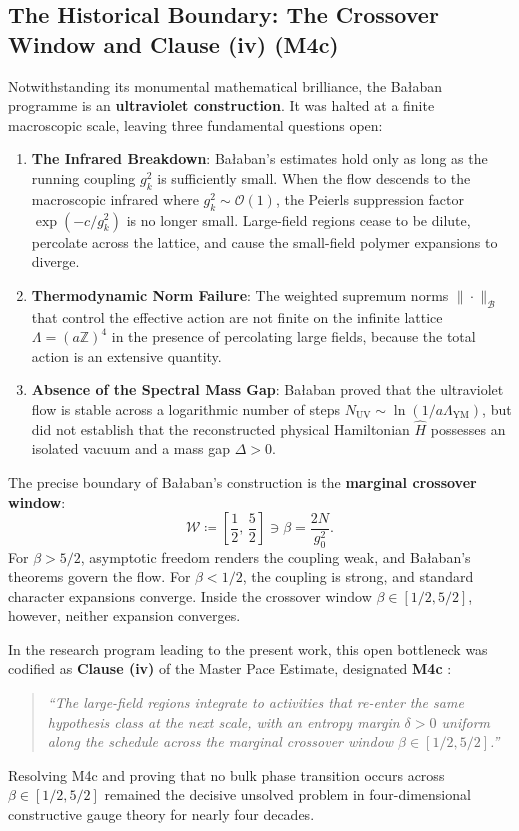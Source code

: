 \subsection{The Historical Boundary: The Crossover Window and Clause (iv) (M4c)}
\label{subsec:crossover_wall_intro}
Notwithstanding its monumental mathematical brilliance, the Ba\l aban programme is an \textbf{ultraviolet construction}. It was halted at a finite macroscopic scale, leaving three fundamental questions open:
\begin{enumerate}
    \item \textbf{The Infrared Breakdown}: Ba\l aban's estimates hold only as long as the running coupling $g_k^2$ is sufficiently small. When the flow descends to the macroscopic infrared where $g_k^2 \sim \mathcal{O}(1)$, the Peierls suppression factor $\exp(-c/g_k^2)$ is no longer small. Large-field regions cease to be dilute, percolate across the lattice, and cause the small-field polymer expansions to diverge.
    \item \textbf{Thermodynamic Norm Failure}: The weighted supremum norms $\|\cdot\|_{\mathcal{B}}$ that control the effective action are not finite on the infinite lattice $\Lambda = (a\mathbb{Z})^4$ in the presence of percolating large fields, because the total action is an extensive quantity.
    \item \textbf{Absence of the Spectral Mass Gap}: Ba\l aban proved that the ultraviolet flow is stable across a logarithmic number of steps $N_{\mathrm{UV}} \sim \ln(1 / a\Lambda_{\mathrm{YM}})$, but did not establish that the reconstructed physical Hamiltonian $\hat{H}$ possesses an isolated vacuum and a mass gap $\Delta > 0$.
\end{enumerate}

The precise boundary of Ba\l aban's construction is the \textbf{marginal crossover window}:
\begin{equation}
\label{eq:crossover_window_intro}
\mathcal{W} \coloneqq \left[ \frac{1}{2}, \, \frac{5}{2} \right] \ni \beta = \frac{2N}{g_0^2}.
\end{equation}
For $\beta > 5/2$, asymptotic freedom renders the coupling weak, and Ba\l aban's theorems govern the flow. For $\beta < 1/2$, the coupling is strong, and standard character expansions converge. Inside the crossover window $\beta \in [1/2, 5/2]$, however, neither expansion converges. 

In the research program leading to the present work, this open bottleneck was codified as \textbf{Clause (iv)} of the Master Pace Estimate, designated \textbf{M4c} \cite{OuladBrahim2026}:
\begin{quote}
\emph{``The large-field regions integrate to activities that re-enter the same hypothesis class at the next scale, with an entropy margin $\delta > 0$ uniform along the schedule across the marginal crossover window $\beta \in [1/2, 5/2]$.''}
\end{quote}
Resolving M4c and proving that no bulk phase transition occurs across $\beta \in [1/2, 5/2]$ remained the decisive unsolved problem in four-dimensional constructive gauge theory for nearly four decades.


